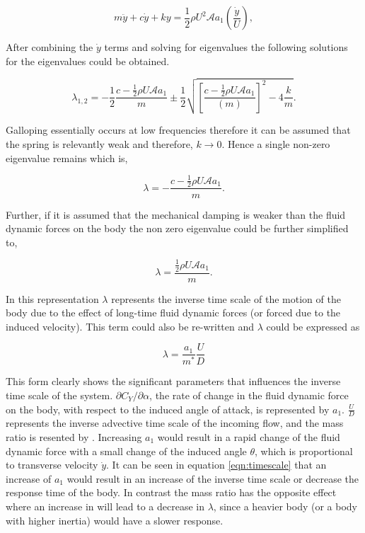 \begin{equation}
\label{eqn:eom_linear}
m\ddot{y}{+}c\dot{y}{+}ky{=}\frac{1}{2}\rho U^2 \mathcal{A} a_1\left(\frac{\dot{y}}{U}\right),
\end{equation}

After combining the $\dot{y}$ terms and solving for eigenvalues the following solutions for the eigenvalues could be obtained. 

 \begin{equation}
 \label{eqn:eigs}
 \lambda_{1,2}= -\frac{1}{2}\frac{c-\frac{1}{2}\rho U\mathcal{A}a_1}{m}\pm\frac{1}{2}\sqrt{\left[\frac{c-\frac{1}{2}\rho U\mathcal{A}a_1}{(m)}\right]^2-4\frac{k}{m}}.
 \end{equation} 
 
 Galloping essentially occurs at low frequencies therefore it can be assumed that the spring is relevantly weak and therefore, $k \rightarrow 0$. Hence a single non-zero eigenvalue remains which is, 
  
  \begin{equation}
  \label{eqn:eigs_nospring}
  \lambda=-\frac{c-\frac{1}{2}\rho U\mathcal{A}a_1}{m}.
  \end{equation}
  
  Further, if it is assumed that the mechanical damping is weaker than the fluid dynamic forces on the body the non zero eigenvalue could be further simplified to,
  
 \begin{equation}
 \label{eqn:eigs_nospring_nodamp}
 \lambda=\frac{\frac{1}{2}\rho U\mathcal{A}a_1}{m}.
 \end{equation}  

In this representation $\lambda$ represents the inverse time scale of the motion of the body due to the effect of long-time fluid dynamic forces (or forced due to the induced velocity). This term could also be re-written and $\lambda$ could be expressed as 

\begin{equation}
\label{eqn:timescale}
\lambda = \frac{a_1}{m^*}\frac{U}{D}
\end{equation}

This form clearly shows the significant parameters that influences the inverse time scale of the system. $\partial C_Y / \partial \alpha $, the rate of change in the fluid dynamic force on the body, with respect to the induced angle of attack, is represented by $a_1$. $\frac{U}{D}$ represents the inverse advective time scale of the incoming flow, and the mass ratio is resented by \mstar. Increasing $a_1$ would result in a rapid change of the fluid dynamic force with a small change of the induced angle $\theta$, which is proportional to transverse velocity $\dot{y}$. It can be seen in equation \ref{eqn:timescale} that an increase of $a_{1}$ would result in an increase of the inverse time scale or decrease the response time of the body. In contrast the mass ratio has the opposite effect where an increase in \mstar will lead to a decrease in $\lambda$, since a heavier body (or a body with higher inertia) would have a slower response. 

